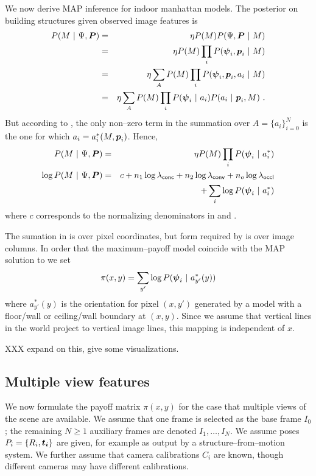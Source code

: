 \documentclass{article}
\newcommand\ColPayoff{\pi}
\newcommand\Model{M}
\newcommand\Feature{\vect{\psi}}
\newcommand\Features{\Psi}
\newcommand\Pixel{\vect{p}}
\newcommand\Pixels{\vect{P}}
\newcommand\Orient{a}
\newcommand\PenaltyOccl{\lambda_\textsf{occl}}
\newcommand\PenaltyConc{\lambda_\textsf{conc}}
\newcommand\PenaltyConv{\lambda_\textsf{conv}}
\begin{document}
We now derive MAP inference for indoor manhattan models. The posterior
on building structures given observed image features is
\begin{eqnarray}
  P(\Model ~|~ \Features,\Pixels) &=&
  \eta P(\Model) P(\Features,\Pixels ~|~ \Model)
  \\
  &=& \eta P(\Model) \prod_i P(\Feature_i,\Pixel_i ~|~ \Model)
  \\
  &=& \eta \sum_A P(\Model) \prod_i
    P(\Feature_i,\Pixel_i, \Orient_i  ~|~ \Model)
  \\
  &=& \eta \sum_A P(\Model) \prod_i P(\Feature_i ~|~ \Orient_i)
    P(\Orient_i ~|~ \Pixel_i,\Model) ~.
\end{eqnarray}
But according to , the only non--zero term in the
summation over $A=\{a_i\}_{i=0}^N$ is the one for which $a_i =
  a_i^*(\Model,\Pixel_i)$. Hence,
\begin{eqnarray}
  \label{eq:mono-post}
  P(\Model ~|~ \Features,\Pixels) &=&
  \eta P(\Model) \prod_i P(\Feature_i ~|~ \Orient_i^*) \\
  \label{eq:mono-logpost}
  \log P(\Model ~|~ \Features,\Pixels) &=&
  c + n_1 \log \PenaltyConc + n_2 \log \PenaltyConv + n_o \log \PenaltyOccl \\
  && + \sum_i \log P(\Feature_i ~|~ \Orient_i^*)
\end{eqnarray}
where $c$ corresponds to the normalizing denominators in
 and .

The sumation in  is over pixel coordinates, but
form required by  is over image columns. In
order that the maximum--payoff model coincide with the MAP solution
to \label{eq:mono-logpost} we set
\begin{equation}
  \ColPayoff(x,y) = \sum_{y'} \log P(\Feature_i ~|~ \Orient_{y'}^*(y))
\end{equation}
where $\Orient_{y'}^*(y)$ is the orientation for pixel $(x,y')$
generated by a model with a floor/wall or ceiling/wall boundary at
$(x,y)$. Since we assume that vertical lines in the world project to
vertical image lines, this mapping is independent of $x$.

XXX expand on this, give some visualizations.

\subsection{Multiple view features}

We now formulate the payoff matrix $\ColPayoff(x,y)$ for the case
that multiple views of the scene are available. We assume that one
frame is selected as the base frame $I_0$; the remaining $N\geq1$
auxiliary frames are denoted $I_1,\ldots,I_N$. We assume poses
$P_i=\{R_i,\boldsymbol{t_i}\}$ are given, for example as output by a
structure--from--motion system. We further assume that camera
calibrations $C_i$ are known, though different cameras may have
different calibrations.
\end{document}
